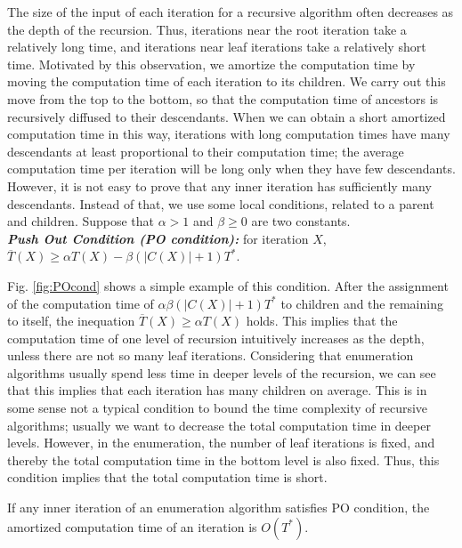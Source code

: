 \documentclass{llncs}
\begin{document}
The size of the input of each iteration for a recursive algorithm often
 decreases as the depth of the recursion. 
Thus, iterations near the root iteration take a relatively long
 time, and iterations near leaf iterations take a relatively short time.
Motivated by this observation, we amortize the computation time by 
 moving the computation time of each iteration to its children.
We carry out this move from the top to the bottom, so that the computation
 time of ancestors is recursively diffused to their descendants.
When we can obtain a short amortized computation time in this way, iterations
 with long computation times have many descendants at least proportional
 to their computation time; the average computation time per iteration
 will be long only when they have few descendants.
However, it is not easy to prove that any inner iteration has sufficiently
 many descendants.
Instead of that, we use some local conditions, related to a parent and
 children.
Suppose that $\alpha > 1$ and $\beta\geq 0$ are two constants.\\

\vspace{-1mm}
\noindent 
{\bf \em Push Out Condition (PO condition):} for iteration $X$,
$\overline{T}(X) \ge \alpha T(X) - \beta (|C(X)|+1)T^*$.\\
\vspace{-1mm}

\noindent
Fig. \ref{fig:POcond} shows a simple example of this condition.
After the assignment of the computation time of $\alpha\beta (|C(X)|+1)T^*$
 to children and the remaining to itself, the inequation
 $\overline{T}(X) \ge \alpha T(X)$ holds.
This implies that the computation time of one level of
 recursion intuitively increases as the depth, unless there are not so many
  leaf iterations.
Considering that enumeration algorithms usually spend less time in deeper 
 levels of the recursion, we can see that this implies that each iteration
  has many children on average.
This is in some sense not a typical condition to bound the time complexity 
 of recursive algorithms; usually we want to decrease the total computation
 time in deeper levels.
However, in the enumeration, the number of leaf iterations is fixed, and 
 thereby the total computation time in the bottom level is also fixed.
Thus, this condition implies that the total computation time is short.

\begin{theorem}\label{poa}
If any inner iteration of an enumeration algorithm satisfies PO condition,
 the amortized computation time of an iteration is $O(T^*)$.
\end{theorem}
\vspace{-3mm}
\end{document}
